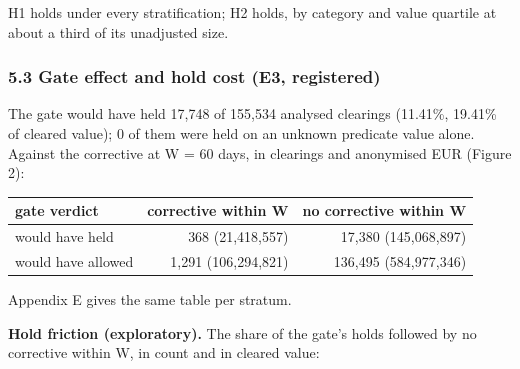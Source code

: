 \documentclass[
  10pt,
]{article}
\begin{document}
H1 holds under every stratification; H2 holds, by category and value
quartile at about a third of its unadjusted size.

\hypertarget{gate-effect-and-hold-cost-e3-registered}{%
\subsubsection{5.3 Gate effect and hold cost (E3,
registered)}\label{gate-effect-and-hold-cost-e3-registered}}

The gate would have held 17,748 of 155,534 analysed clearings (11.41\%,
19.41\% of cleared value); 0 of them were held on an unknown predicate
value alone. Against the corrective at W = 60 days, in clearings and
anonymised EUR (Figure 2):

\begin{longtable}[]{@{}lrr@{}}
\toprule\noalign{}
gate verdict & corrective within W & no corrective within W \\
\midrule\noalign{}
\endhead
\bottomrule\noalign{}
\endlastfoot
would have held & 368 (21,418,557) & 17,380 (145,068,897) \\
would have allowed & 1,291 (106,294,821) & 136,495 (584,977,346) \\
\end{longtable}

Appendix E gives the same table per stratum.

\textbf{Hold friction (exploratory).} The share of the gate's holds
followed by no corrective within W, in count and in cleared value:
\end{document}
